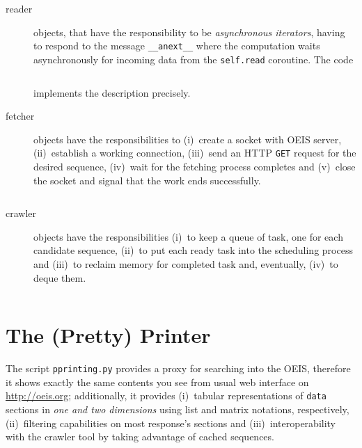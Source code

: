 \begin{description}
\item[reader] objects, that have the responsibility to be \textit{asynchronous
iterators}, having to respond to the message \verb|__anext__| where the
computation waits asynchronously for incoming data from the \verb|self.read|
coroutine. The code
\inputminted[fontsize=\small,stripnl=false,firstline=28,lastline=39]
{python}{deps/oeis-tools/src/crawling.py} implements the description precisely.

\item[fetcher] objects have the responsibilities to (i)~create a socket with
OEIS server, (ii)~establish a working connection, (iii)~send an HTTP \verb|GET|
request for the desired sequence, (iv)~wait for the fetching process completes
and (v)~close the socket and signal that the work ends successfully.
\inputminted[fontsize=\small,stripnl=false,firstline=41,lastline=86]
    {python}{deps/oeis-tools/src/crawling.py}

\item[crawler] objects have the responsibilities (i)~to keep a queue of task,
one for each candidate sequence, (ii)~to put each ready task into the
scheduling process and (iii)~to reclaim memory for completed task and,
eventually, (iv)~to deque them.
\inputminted[fontsize=\small,stripnl=false,firstline=89,lastline=117]
    {python}{deps/oeis-tools/src/crawling.py}

\end{description}

\iffalse
Finally, the function \verb|oeis| puts all together and it is the main
interface exported by the \verb|crawling| module:
\inputminted[fontsize=\small,stripnl=false,firstline=195,lastline=221]
    {python}{deps/oeis-tools/src/crawling.py}
\fi

\section{The (Pretty) Printer}

The script \verb|pprinting.py| provides a proxy for searching into the OEIS,
therefore it shows exactly the same contents you see from usual web interface
on \url{http://oeis.org}; additionally, it provides (i)~tabular representations
of \verb|data| sections in \textit{one and two dimensions} using list and
matrix notations, respectively, (ii)~filtering capabilities on most response's
sections and (iii)~interoperability with the crawler tool by taking advantage of
cached sequences.

